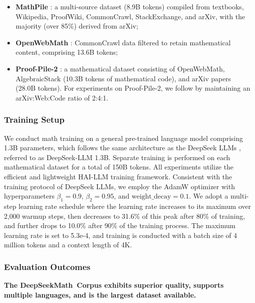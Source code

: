\begin{itemize}[topsep=0pt]
    \item \textbf{MathPile} \citep{mathpile}: a multi-source dataset (8.9B tokens) compiled from textbooks, Wikipedia, ProofWiki, CommonCrawl, StackExchange, and arXiv, with the majority (over 85\%) derived from arXiv;
    \item \textbf{OpenWebMath} \citep{openwebmath}: CommonCrawl data filtered to retain mathematical content, comprising 13.6B tokens;
    \item \textbf{Proof-Pile-2} \citep{llemma}: a mathematical dataset consisting of OpenWebMath, AlgebraicStack (10.3B tokens of mathematical code), and arXiv papers (28.0B tokens). For experiments on Proof-Pile-2, we follow \cite{llemma} by maintaining an arXiv:Web:Code ratio of 2:4:1.
\end{itemize}

\subsubsection{Training Setup}
\label{sec:quality-policy}
We conduct math training on a general pre-trained language model comprising 1.3B parameters, which follows the same architecture as the DeepSeek LLMs \citep{deepseek-llm}, referred to as DeepSeek-LLM 1.3B. Separate training is performed on each mathematical dataset for a total of 150B tokens. All experiments utilize the efficient and lightweight HAI-LLM \citep{haillm} training framework. Consistent with the training protocol of DeepSeek LLMs, we employ the AdamW optimizer \citep{adamW} with hyperparameters $\beta_1=0.9$, $\beta_2=0.95$, and $\mathrm{weight\_decay}=0.1$. We adopt a multi-step learning rate schedule where the learning rate increases to its maximum over 2,000 warmup steps, then decreases to 31.6\% of this peak after 80\% of training, and further drops to 10.0\% after 90\% of the training process. The maximum learning rate is set to 5.3e-4, and training is conducted with a batch size of 4 million tokens and a context length of 4K.

\subsubsection{Evaluation Outcomes}

\textbf{The DeepSeekMath~Corpus exhibits superior quality, supports multiple languages, and is the largest dataset available.}

